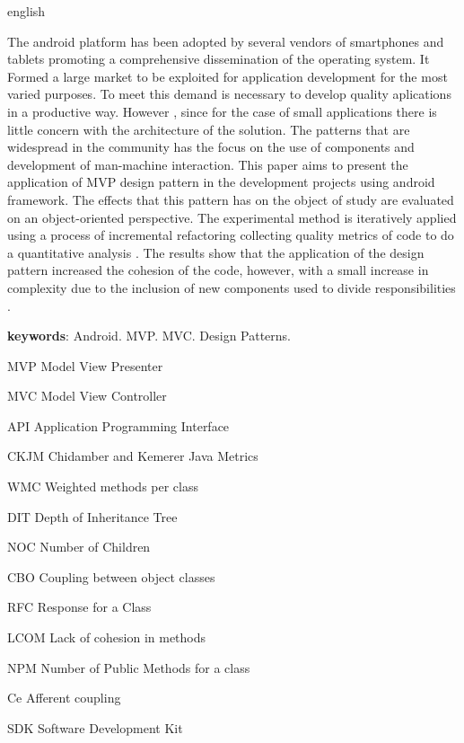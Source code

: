 \documentclass[
	12pt,				%
	a4paper,			%
	oneside,
	english,			%
	spanish,			%
	brazil,				%
	]{abntex2}
\begin{document}
\begin{resumo}[Abstract]
 \begin{otherlanguage*}{english}

The android platform has been adopted by several vendors of smartphones and
tablets promoting a comprehensive dissemination of the operating system.
It Formed a large market to be exploited for application development
for the most varied purposes. To meet this demand is necessary to develop
quality aplications in a productive way. However , since for the case
of small applications there is little concern with the architecture of the solution.
The patterns that are widespread in the community has the focus on the use of
components and development of man-machine interaction. This paper aims to present the
application of MVP design pattern in the development projects using android
framework. The effects that this pattern has on the object of study are
evaluated on an object-oriented perspective. The experimental method is
iteratively applied using a  process of incremental refactoring collecting
quality metrics of code to do a quantitative analysis .
The results show that the application of the design pattern increased the
cohesion of the code, however, with a small increase in complexity due to the inclusion of new
components used to divide responsibilities .

 \vspace{\onelineskip}

 \noindent
 \textbf{keywords}: Android. MVP. MVC. Design Patterns.
 \end{otherlanguage*}
\end{resumo}


\listoffigures*
\cleardoublepage

\listoftables*
\cleardoublepage

\begin{siglas}
	\item[MVP] 	Model View Presenter
  	\item[MVC]	Model View Controller
  	\item[API] 	Application Programming Interface
  	\item[CKJM] Chidamber and Kemerer Java Metrics
   	\item[WMC] 	Weighted methods per class
 	\item[DIT] 	Depth of Inheritance Tree
 	\item[NOC] 	Number of Children
 	\item[CBO] 	Coupling between object classes
 	\item[RFC] 	Response for a Class
 	\item[LCOM] Lack of cohesion in methods
   	\item[NPM] 	Number of Public Methods for a class
\item[Ce]Afferent coupling
\item[SDK] Software Development Kit


\end{siglas}
\end{document}
